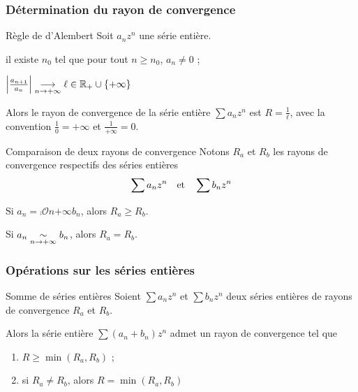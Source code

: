     \subsubsection{Détermination du rayon de convergence}

    \begin{prop}{Règle de d’Alembert}{}
        Soit $a_n z^n$ une série entière.
        \begin{suppose}
            \item il existe $n_0$ tel que pour tout $n \geq n_0$, $a_n \neq 0$ ;
            \item $\left\lvert \frac{a_{n+1}}{a_n}\right\rvert \underset{n \rightarrow +\infty}{\longrightarrow} \ell \in \mathbb{R}_+ \cup \{+\infty\}$
        \end{suppose}
        Alors le rayon de convergence de la série entière $\sum a_n z^n$ est $R = \frac{1}{\ell}$, avec la convention $\frac{1}{0} = +\infty$ et $\frac{1}{+\infty} = 0$.
    \end{prop}

    \begin{prop}{Comparaison de deux rayons de convergence}{}
        Notons $R_a$ et $R_b$ les rayons de convergence respectifs des séries entières 
        \[ \sum a_n z^n \quad \text{et} \quad \sum b_n z^n \]
        \begin{alors}
            \item Si $a_n = \comp{\mathcal{O}}{n}{+\infty}{b_n}$, alors $R_a \geq R_b$.
            \item Si $a_n \underset{n \rightarrow +\infty}{\sim} b_n$, alors $R_a = R_b$.
        \end{alors}
    \end{prop}

    \subsubsection{Opérations sur les séries entières}

    \begin{prop}{Somme de séries entières}{}
        Soient $\sum a_n z^n$ et $\sum b_n z^n$ deux séries entières de rayons de convergence $R_a$ et $R_b$. 

        Alors la série entière $\sum (a_n + b_n) z^n$ admet un rayon de convergence tel que 
        \begin{enumerate}
            \item $R \geq \min(R_a,R_b)$ ;
            \item si $R_a \neq R_b$, alors $R = \min(R_a,R_b)$
        \end{enumerate}
    \end{prop}

